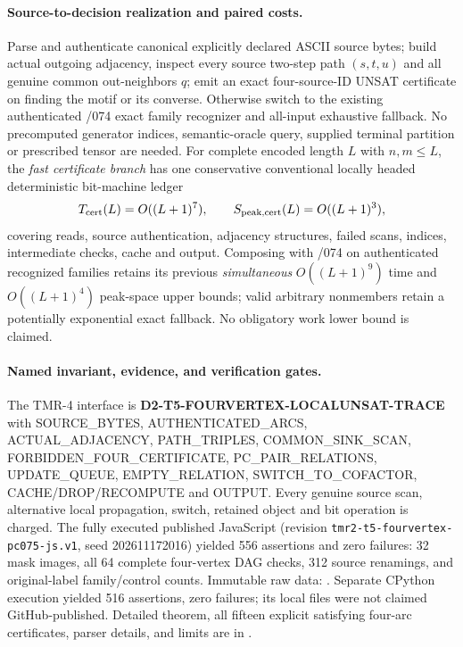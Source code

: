 \documentclass[11pt]{article}
\begin{document}
\paragraph{Source-to-decision realization and paired costs.}
Parse and authenticate canonical explicitly declared ASCII
source bytes; build actual outgoing adjacency, inspect
every source two-step path $(s,t,u)$ and all genuine common
out-neighbors $q$; emit an exact four-source-ID UNSAT
certificate on finding the motif or its converse. Otherwise
switch to the existing authenticated /074 exact family
recognizer and all-input exhaustive fallback.
No precomputed generator indices, semantic-oracle query,
supplied terminal partition or prescribed tensor are needed.
For complete encoded length $L$ with $n,m\le L$,
the \emph{fast certificate branch} has one conservative
conventional locally headed deterministic bit-machine ledger
\[
T_{\rm cert}(L)=O((L+1)^7),\qquad
S_{\rm peak,cert}(L)=O((L+1)^3),
\]
covering reads, source authentication, adjacency structures,
failed scans, indices, intermediate checks, cache and output.
Composing with /074 on authenticated recognized families retains
its previous \emph{simultaneous} $O((L+1)^9)$ time and
$O((L+1)^4)$ peak-space upper bounds; valid arbitrary nonmembers
retain a potentially exponential exact fallback. No obligatory
work lower bound is claimed.

\paragraph{Named invariant, evidence, and verification gates.}
The TMR-4 interface is
\textbf{D2-T5-FOURVERTEX-LOCALUNSAT-TRACE} with
SOURCE\_BYTES, AUTHENTICATED\_ARCS, ACTUAL\_ADJACENCY,
PATH\_TRIPLES, COMMON\_SINK\_SCAN,
FORBIDDEN\_FOUR\_CERTIFICATE, PC\_PAIR\_RELATIONS,
UPDATE\_QUEUE, EMPTY\_RELATION, SWITCH\_TO\_COFACTOR,
CACHE/DROP/RECOMPUTE and OUTPUT.
Every genuine source scan, alternative local propagation,
switch, retained object and bit operation is charged.
The fully executed published JavaScript
(revision \texttt{tmr2-t5-fourvertex-pc075-js.v1},
seed 202611172016) yielded 556 assertions and zero failures:
32 mask images, all 64 complete four-vertex DAG checks,
312 source renamings, and original-label family/control counts.
Immutable raw data:
.
Separate CPython execution yielded 516 assertions, zero
failures; its local files were not claimed GitHub-published.
Detailed theorem, all fifteen explicit satisfying four-arc
certificates, parser details, and limits are in
.
\end{document}
